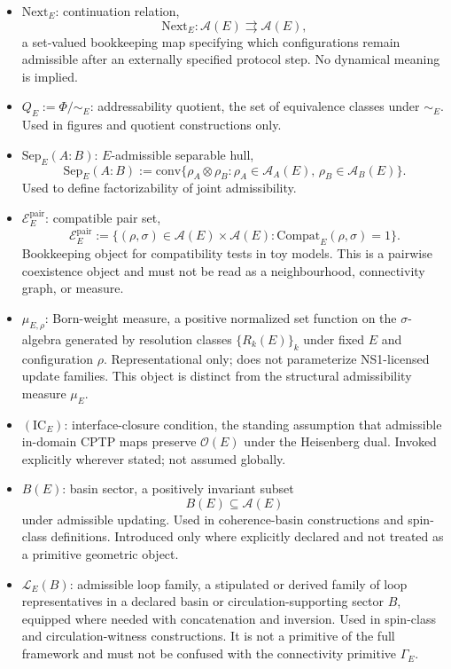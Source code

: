\documentclass[aps,prx,onecolumn,11pt]{revtex4-2}
\theoremstyle{plain}
\theoremstyle{definition}
\theoremstyle{remark}
\begin{document}
\begin{itemize}
\item $\mathrm{Next}_E$: continuation relation,
\[
\mathrm{Next}_E :
\mathcal{A}(E)
\rightrightarrows
\mathcal{A}(E),
\]
a set-valued bookkeeping map specifying which configurations remain
admissible after an externally specified protocol step. No dynamical
meaning is implied.

\item $Q_E := \Phi/{\sim_E}$: addressability quotient, the set of
equivalence classes under $\sim_E$. Used in figures and quotient
constructions only.

\item $\mathrm{Sep}_E(A{:}B)$: $E$-admissible separable hull,
\[
\mathrm{Sep}_E(A{:}B)
:=
\mathrm{conv}\{
\rho_A \otimes \rho_B :
\rho_A \in \mathcal{A}_A(E),\,
\rho_B \in \mathcal{A}_B(E)
\}.
\]
Used to define factorizability of joint admissibility.

\item $\mathcal{E}^{\mathrm{pair}}_E$: compatible pair set,
\[
\mathcal{E}^{\mathrm{pair}}_E :=
\{
(\rho,\sigma)
\in
\mathcal{A}(E)\times\mathcal{A}(E) :
\mathrm{Compat}_E(\rho,\sigma)=1
\}.
\]
Bookkeeping object for compatibility tests in toy models. This is a
pairwise coexistence object and must not be read as a neighbourhood,
connectivity graph, or measure.

\item $\mu_{E,\rho}$: Born-weight measure, a positive normalized set
function on the $\sigma$-algebra generated by resolution classes
$\{R_k(E)\}_k$ under fixed $E$ and configuration $\rho$.
Representational only; does not parameterize NS1-licensed update
families. This object is distinct from the structural admissibility
measure $\mu_E$.

\item $(\mathrm{IC}_E)$: interface-closure condition, the standing
assumption that admissible in-domain CPTP maps preserve
$\mathcal{O}(E)$ under the Heisenberg dual. Invoked explicitly wherever
stated; not assumed globally.

\item $B(E)$: basin sector, a positively invariant subset
\[
B(E) \subseteq \mathcal{A}(E)
\]
under admissible updating. Used in coherence-basin constructions and
spin-class definitions. Introduced only where explicitly declared and
not treated as a primitive geometric object.

\item $\mathcal{L}_E(B)$: admissible loop family, a stipulated or
derived family of loop representatives in a declared basin or
circulation-supporting sector $B$, equipped where needed with
concatenation and inversion. Used in spin-class and
circulation-witness constructions. It is not a primitive of the full
framework and must not be confused with the connectivity primitive
$\Gamma_E$.


\end{itemize}
\end{document}
